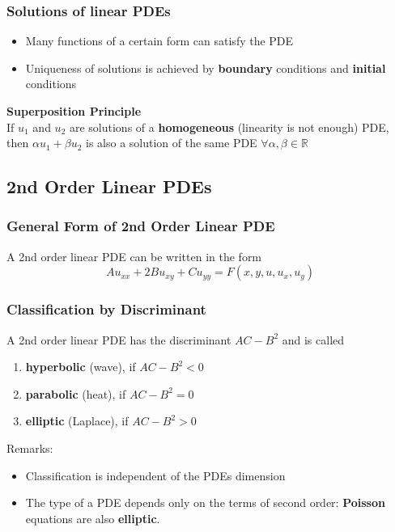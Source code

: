 \subsubsection{Solutions of linear PDEs}
\begin{itemize}
    \item Many functions of a certain form can satisfy the PDE
    \item Uniqueness of solutions is achieved by \textbf{boundary} conditions and \textbf{initial} conditions
\end{itemize}
\vspace{5pt}
\textbf{Superposition Principle}\\
If $u_{1}$ and $u_{2}$ are solutions of a \textbf{homogeneous} (linearity is not enough) PDE, then $\alpha u_{1} + \beta u_{2}$ is also a solution of the same PDE $\forall \alpha , \beta \in \mathbb{R}$

\subsection{2nd Order Linear PDEs}
\subsubsection{General Form of 2nd Order Linear PDE}
A 2nd order linear PDE can be written in the form
\begin{equation*}
    Au_{xx}+2Bu_{xy}+Cu_{yy}=F(x,y,u,u_x,u_y)
\end{equation*}

\subsubsection{Classification by Discriminant}
A 2nd order linear PDE has the discriminant $AC-B^2$ and is called
\begin{enumerate}
    \item \textbf{hyperbolic} (wave), if $AC-B^2<0$
    \item \textbf{parabolic} (heat), if $AC-B^2=0$
    \item \textbf{elliptic} (Laplace), if $AC-B^2>0$
\end{enumerate}
\vspace{5pt}
Remarks:
\begin{itemize}
    \item Classification is independent of the PDEs dimension\vspace{5pt}
    \item The type of a PDE depends only on the terms of second order: \textbf{Poisson} equations are also \textbf{elliptic}.
\end{itemize}

